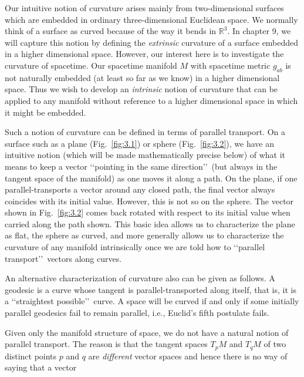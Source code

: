 
Our intuitive notion of curvature arises mainly from two-dimensional surfaces which
are embedded in ordinary three-dimensional Euclidean space. We normally think of
a surface as curved because of the way it bends in $\mathbb R^3$. In chapter 9, we will capture
this notion by defining the \emph{extrinsic} curvature of a surface embedded in a higher
dimensional space. However, our interest here is to investigate the curvature of
spacetime. Our spacetime manifold $M$ with spacetime metric $g_{ab}$ is not naturally
embedded (at least so far as we know) in a higher dimensional space. Thus we wish
to develop an \emph{intrinsic} notion of curvature that can be applied to any manifold
without reference to a higher dimensional space in which it might be embedded.

Such a notion of curvature can be defined in terms of parallel transport. On a
surface such as a plane (Fig.~\ref{fig:3.1}) or sphere (Fig.~\ref{fig:3.2}), we have an intuitive notion
(which will be made mathematically precise below) of what it means to keep a vector
\lq\lq pointing in the same direction\rq\rq\ (but always in the tangent space of the manifold) as
one moves it along a path. On the plane, if one parallel-transports a vector around
any closed path, the final vector always coincides with its initial value. However, this
is not so on the sphere. The vector shown in Fig.~\ref{fig:3.2} comes back rotated with
respect to its initial value when carried along the path shown. This basic idea allows
us to characterize the plane as flat, the sphere as curved, and more generally allows
us to characterize the curvature of any manifold intrinsically once we are told how
to \lq\lq parallel transport\rq\rq\ vectors along curves.

An alternative characterization of curvature also can be given as follows. A
geodesic is a curve whose tangent is parallel-transported along itself, that is, it is a
\lq\lq straightest possible\rq\rq\ curve. A space will be curved if and only if some initially
parallel geodesics fail to remain parallel, i.e., Euclid's fifth postulate fails.

Given only the manifold structure of space, we do not have a natural notion of
parallel transport. The reason is that the tangent spaces $T_pM$ and $T_qM$ of two distinct points
$p$ and $q$ are \emph{different} vector spaces and hence there is no way of saying that a vector

